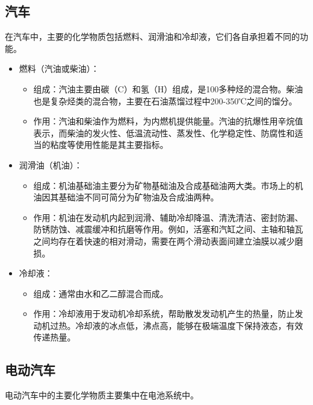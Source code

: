 \documentclass[UTF8]{report}
\theoremstyle{MyLineTheoremStyle} %
\theoremstyle{MyBlockTheoremStyle} %
\theoremstyle{MySubsubsectionStyle} %
\begin{document}
\subsection{汽车}

在汽车中，主要的化学物质包括燃料、润滑油和冷却液，它们各自承担着不同的功能。

\begin{itemize}
    \item 燃料（汽油或柴油）：
    \begin{itemize}
        \item 组成：汽油主要由碳（C）和氢（H）组成，是100多种烃的混合物。柴油也是复杂烃类的混合物，主要在石油蒸馏过程中200-350℃之间的馏分。
        \item 作用：汽油和柴油作为燃料，为内燃机提供能量。汽油的抗爆性用辛烷值表示，而柴油的发火性、低温流动性、蒸发性、化学稳定性、防腐性和适当的粘度等使用性能是其主要指标。
    \end{itemize}
    \item 润滑油（机油）：
    \begin{itemize}
        \item 组成：机油基础油主要分为矿物基础油及合成基础油两大类。市场上的机油因其基础油不同可简分为矿物油及合成油两种。
        \item 作用：机油在发动机内起到润滑、辅助冷却降温、清洗清洁、密封防漏、防锈防蚀、减震缓冲和抗磨等作用。例如，活塞和汽缸之间、主轴和轴瓦之间均存在着快速的相对滑动，需要在两个滑动表面间建立油膜以减少磨损。
    \end{itemize}
    \item 冷却液：
    \begin{itemize}
        \item 组成：通常由水和乙二醇混合而成。
        \item 作用：冷却液用于发动机冷却系统，帮助散发发动机产生的热量，防止发动机过热。冷却液的冰点低，沸点高，能够在极端温度下保持液态，有效传递热量。
    \end{itemize}
\end{itemize}

\subsection{电动汽车}

电动汽车中的主要化学物质主要集中在电池系统中。
\end{document}
